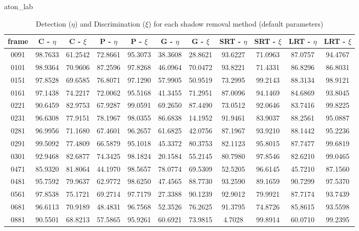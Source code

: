 \begin{appendices}
\begin{table}
\begin{tabular}{ |c|c|c|c|c|c|c|c|c|c|c| }
\hline
\end{tabular}

\end{table}

\begin{table}
\centering
\caption{aton\_lab}
\caption*{Detection ($\eta$) and Discrimination ($\xi$) for each shadow removal method (default parameters)}
\begin{tabular}{ |c|c|c|c|c|c|c|c|c|c|c| }
	\hline
\textbf{frame} &  \textbf{C - $\eta$} &  \textbf{C - $\xi$} &  \textbf{P - $\eta$} &  \textbf{P - $\xi$} &  \textbf{G - $\eta$} &  \textbf{G - $\xi$} &  \textbf{SRT - $\eta$} &  \textbf{SRT - $\xi$} &  \textbf{LRT - $\eta$} &  \textbf{LRT - $\xi$} \\
\hline
\hline
0091 &  98.7633 &  61.2542 &   72.8661 &  95.3073 &   38.3608 &  28.8621 &   93.6227 &  71.0963 &   87.0757 &  94.4767    \\
\hline
0101 &  98.9364 &  70.9606 &   87.2596 &  97.8268 &   46.0964 &  70.0472 &   93.8221 &  71.4331 &   86.8296 &  86.8031    \\
\hline
0151 &  97.8528 &  69.6585 &   76.8071 &  97.1290 &   57.9905 &  50.9519 &   73.2995 &  99.2143 &   88.3134 &  98.9121    \\
\hline
0161 &  97.1438 &  74.2217 &   72.0062 &  95.5168 &   41.3455 &  71.2951 &   87.0096 &  94.1469 &   84.6869 &  93.8045    \\
\hline
0221 &  90.6459 &  82.9753 &   67.9287 &  99.0591 &   69.2650 &  87.4490 &   73.0512 &  92.0646 &   83.7416 &  99.8225    \\
\hline
0231 &  96.6308 &  77.9151 &   78.1967 &  98.0355 &   86.6838 &  14.1952 &   91.9461 &  83.9037 &   88.2561 &  95.0887    \\
\hline
0281 &  96.9956 &  71.1680 &   67.4601 &  96.2657 &   61.6825 &  42.0756 &   87.1967 &  93.9210 &   88.1442 &  95.2236    \\
\hline
0291 &  99.5092 &  77.4809 &   66.5879 &  95.1018 &   45.3372 &  80.3753 &   82.1123 &  95.8015 &   87.7477 &  99.6819    \\
\hline
0301 &  92.9468 &  82.6877 &   74.3425 &  98.1824 &   20.1584 &  55.2145 &   80.7980 &  97.8546 &   82.6210 &  99.0465    \\
\hline
0471 &  85.9320 &  81.8064 &   44.1970 &  98.5657 &   78.0774 &  69.5309 &   52.5205 &  96.6145 &   45.7210 &  87.1560    \\
\hline
0481 &  95.7592 &  79.9637 &   62.9772 &  98.6250 &   47.4565 &  88.7730 &   93.2590 &  89.1659 &   90.7299 &  97.5370    \\
\hline
0561 &  97.8538 &  75.1721 &   69.2714 &  97.7179 &   27.3388 &  90.1239 &   92.9012 &  79.9921 &   87.7174 &  93.7439   \\
\hline
0681 &  96.6113 &  70.9189 &   48.4831 &  96.7568 &   52.3526 &  76.2625 &   91.3795 &  74.8726 &   85.8615 &  93.5598    \\
\hline
0881 &  90.5501 &  68.8213 &   57.5865 &  95.9261 &   60.6921 &  73.9815 &   4.7028 &  99.8914 &   60.0710 &  99.2395    \\


\end{tabular}
\end{table}
\end{appendices}
